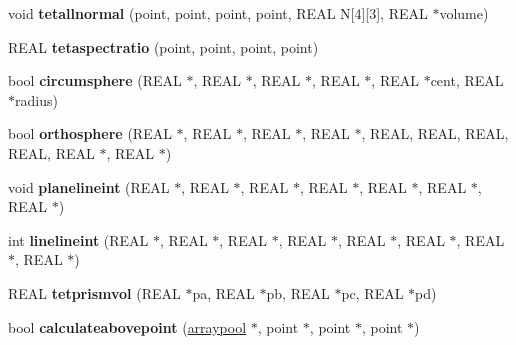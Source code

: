 \begin{DoxyCompactItemize}
\item 
\hypertarget{classtetgenmesh_a1d88027411fb3b8f7c3752b1a0b3eb14}{void {\bfseries tetallnormal} (point, point, point, point, R\-E\-A\-L N\mbox{[}4\mbox{]}\mbox{[}3\mbox{]}, R\-E\-A\-L $\ast$volume)}\label{classtetgenmesh_a1d88027411fb3b8f7c3752b1a0b3eb14}

\item 
\hypertarget{classtetgenmesh_a891ca3fde48f9e3378e14d5537216853}{R\-E\-A\-L {\bfseries tetaspectratio} (point, point, point, point)}\label{classtetgenmesh_a891ca3fde48f9e3378e14d5537216853}

\item 
\hypertarget{classtetgenmesh_aa7ba47e0a0433aa33adc5310c9cf1b84}{bool {\bfseries circumsphere} (R\-E\-A\-L $\ast$, R\-E\-A\-L $\ast$, R\-E\-A\-L $\ast$, R\-E\-A\-L $\ast$, R\-E\-A\-L $\ast$cent, R\-E\-A\-L $\ast$radius)}\label{classtetgenmesh_aa7ba47e0a0433aa33adc5310c9cf1b84}

\item 
\hypertarget{classtetgenmesh_ab7a2c051ce249ec2921fffd2c6c0f24b}{bool {\bfseries orthosphere} (R\-E\-A\-L $\ast$, R\-E\-A\-L $\ast$, R\-E\-A\-L $\ast$, R\-E\-A\-L $\ast$, R\-E\-A\-L, R\-E\-A\-L, R\-E\-A\-L, R\-E\-A\-L, R\-E\-A\-L $\ast$, R\-E\-A\-L $\ast$)}\label{classtetgenmesh_ab7a2c051ce249ec2921fffd2c6c0f24b}

\item 
\hypertarget{classtetgenmesh_a883cf2b9f86e671d486bc33b37b4efe6}{void {\bfseries planelineint} (R\-E\-A\-L $\ast$, R\-E\-A\-L $\ast$, R\-E\-A\-L $\ast$, R\-E\-A\-L $\ast$, R\-E\-A\-L $\ast$, R\-E\-A\-L $\ast$, R\-E\-A\-L $\ast$)}\label{classtetgenmesh_a883cf2b9f86e671d486bc33b37b4efe6}

\item 
\hypertarget{classtetgenmesh_add5ae26e506dad8a94508127140b6aa4}{int {\bfseries linelineint} (R\-E\-A\-L $\ast$, R\-E\-A\-L $\ast$, R\-E\-A\-L $\ast$, R\-E\-A\-L $\ast$, R\-E\-A\-L $\ast$, R\-E\-A\-L $\ast$, R\-E\-A\-L $\ast$, R\-E\-A\-L $\ast$)}\label{classtetgenmesh_add5ae26e506dad8a94508127140b6aa4}

\item 
\hypertarget{classtetgenmesh_af435ddd2a8d966f9e71ee01ff88385b4}{R\-E\-A\-L {\bfseries tetprismvol} (R\-E\-A\-L $\ast$pa, R\-E\-A\-L $\ast$pb, R\-E\-A\-L $\ast$pc, R\-E\-A\-L $\ast$pd)}\label{classtetgenmesh_af435ddd2a8d966f9e71ee01ff88385b4}

\item 
\hypertarget{classtetgenmesh_a8a8dc5b469308dc2c048f9cfc7d0dd62}{bool {\bfseries calculateabovepoint} (\hyperlink{classtetgenmesh_1_1arraypool}{arraypool} $\ast$, point $\ast$, point $\ast$, point $\ast$)}\label{classtetgenmesh_a8a8dc5b469308dc2c048f9cfc7d0dd62}


\end{DoxyCompactItemize}
